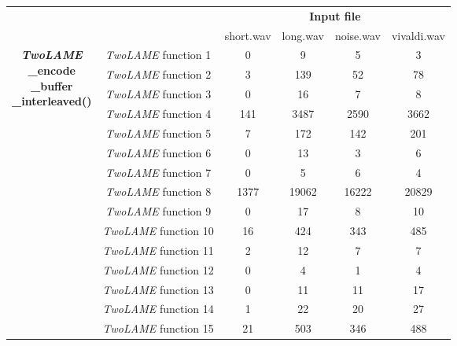 \documentclass{article}
\begin{document}
\begin{table}[H]
    \centering
    \begin{tabular}{|c|c|c|c|c|c|}
    \cline{3-6}
    \multicolumn{2}{c|}{}  & \multicolumn{4}{c|}{\textbf{Input file}} \\
    \cline{3-6}
    \multicolumn{2}{c|}{} & short.wav & long.wav & noise.wav & vivaldi.wav \\
    \cline{1-6}
   \multirow{23}{*}{\parbox{2.5cm}{\centering \textbf{\textit{TwoLAME}} \\ \textbf{\_encode} \\ \textbf{\_buffer} \\ \textbf{\_interleaved()}}}  & \multicolumn{1}{c|}{\textit{TwoLAME} function 1}  & 0 & 9 & 5 & 3 \\ 
    \cline{2-6}
    & \multicolumn{1}{c|}{\textit{TwoLAME} function 2} & 3 & 139 & 52 & 78 \\ 
    \cline{2-6}
    & \multicolumn{1}{c|}{\textit{TwoLAME} function 3} & 0 & 16 & 7 & 8  \\ 
    \cline{2-6}
    & \multicolumn{1}{c|}{\textit{TwoLAME} function 4} & 141  & 3487 & 2590 & 3662  \\ 
    \cline{2-6}
    & \multicolumn{1}{c|}{\textit{TwoLAME} function 5} & 7 & 172 & 142 &  201  \\ 
    \cline{2-6}
    & \multicolumn{1}{c|}{\textit{TwoLAME} function 6} & 0  & 13 & 3 & 6   \\ 
    \cline{2-6}
    & \multicolumn{1}{c|}{\textit{TwoLAME} function 7} & 0  & 5 & 6 & 4  \\ 
    \cline{2-6}
     & \multicolumn{1}{c|}{\textit{TwoLAME} function 8} & 1377  & 19062 & 16222 &  20829 \\ 
    \cline{2-6}
    & \multicolumn{1}{c|}{\textit{TwoLAME} function 9} & 0 & 17 & 8 &  10 \\ 
    \cline{2-6}
    & \multicolumn{1}{c|}{\textit{TwoLAME} function 10} & 16  & 424 & 343 & 485  \\ 
    \cline{2-6}
    & \multicolumn{1}{c|}{\textit{TwoLAME} function 11} & 2 & 12 & 7 &  7 \\
    \cline{2-6}
    & \multicolumn{1}{c|}{\textit{TwoLAME} function 12} & 0 & 4 & 1 & 4  \\
    \cline{2-6}
    & \multicolumn{1}{c|}{\textit{TwoLAME} function 13} & 0 & 11 & 11 &  17 \\
    \cline{2-6}
    & \multicolumn{1}{c|}{\textit{TwoLAME} function 14} & 1 & 22 & 20 & 27 \\
    \cline{2-6}
    & \multicolumn{1}{c|}{\textit{TwoLAME} function 15} & 21 & 503 & 346 & 488 \\

\end{tabular}
\end{table}
\end{document}
